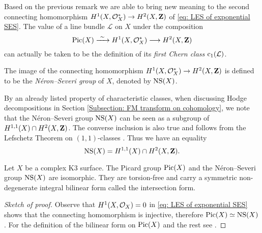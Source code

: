 Based on the previous remark we are able to bring new meaning to the second connecting homomorphism $H^{1}(X, \mathcal O_X^*) \to H^{2}(X, \mathbf Z)$ of \eqref{eq: LES of exponential SES}. 
The value of a line bundle $\mathcal L$ on $X$ under the composition
\[
    \operatorname{Pic}(X) \xrightarrow{\ \sim \ } H^{1}(X, \mathcal O_X^*) \longrightarrow H^{2}(X, \mathbf Z)
\]
can actually be taken to be the definition of its \emph{first Chern class} $\cclass[1]{\mathcal L}$.
\begin{definition}
    The image of the connecting homomorphism $H^{1}(X, \mathcal O_X^*) \to H^{2}(X, \mathbf Z)$ is defined to be the \emph{Néron--Severi group} of $X$, denoted by $\operatorname{NS}(X)$. 
\end{definition}

\begin{remark}
    By an already listed property of characteristic classes, when discussing Hodge decompositions in Section \ref{Subsection: FM transform on cohomology}, we note that the Néron--Severi group $\operatorname{NS}(X)$ can be seen as a subgroup of $H^{1,1}(X) \cap H^{2}(X, \mathbf Z)$. The converse inclusion is also true and follows from the Lefschetz Theorem on $(1,1)$-classes \cite[\S 1.2]{GriffithsHarris1994}. Thus we have an equality
    \begin{equation}
        \label{eq: NS = 1,1 cap 2nd coh}
        \operatorname{NS}(X) = H^{1,1}(X) \cap H^{2}(X, \mathbf Z).
    \end{equation}
\end{remark}

\begin{proposition}
    \label{picard group torsion free}
    \emph{\cite[\S 1, Proposition 2.4]{Huybrechts2016}}
    Let $X$ be a complex K3 surface. The Picard group $\operatorname{Pic}(X)$ and the Néron--Severi group $\operatorname{NS}(X)$ are isomorphic. They are torsion-free and carry a symmetric non-degenerate integral bilinear form called the intersection form. 
\end{proposition}

\begin{proof}[Sketch of proof]
    Observe that $H^{1}(X, {\mathcal{O}_{X}}) = 0$ in \eqref{eq: LES of exponential SES} shows that the connecting homomorphism is injective, therefore $\operatorname{Pic}(X) \simeq \operatorname{NS}(X)$. For the definition of the bilinear form on $\operatorname{Pic}(X)$ and the rest see \cite[\S 1, Proposition 2.4]{Huybrechts2016}.
\end{proof}

